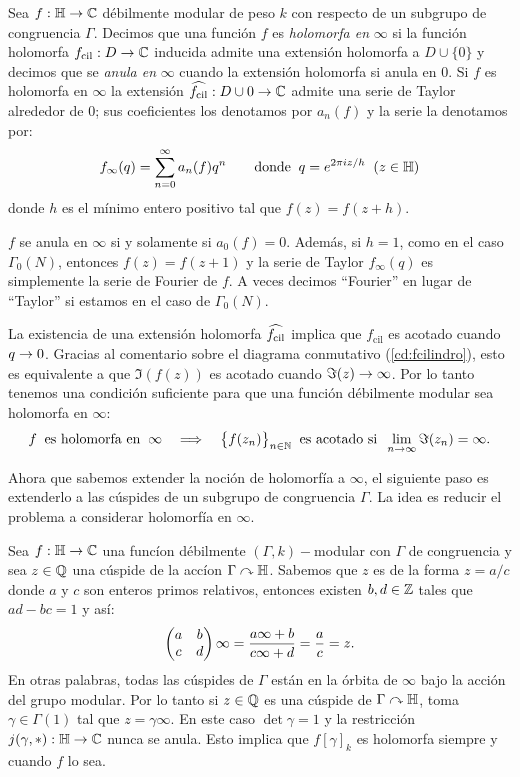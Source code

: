\begin{defin}
  Sea $f:\mathbb{H}\rightarrow\mathbb{C}$ d\'ebilmente modular de peso $k$ con respecto de un subgrupo de congruencia
  $\Gamma$. Decimos que una funci\'on $f$ es \emph{holomorfa en} $\infty$ si la funci\'on holomorfa
  $f_{\mathrm{cil}}:D\rightarrow\mathbb{C}$ inducida admite una extensi\'on holomorfa a $D\cup\{0\}$ y decimos que
  se \emph{anula en} $\infty$ cuando la extensi\'on holomorfa si anula en 0. Si $f$ es holomorfa en
  $\infty$ la extensi\'on $\what{f_{\mathrm{cil}}}:D\cup{0}\ra\CC$ admite una serie de Taylor
  alrededor de $0$; sus coeficientes los denotamos por $a_n(f)$ y la serie la denotamos por:
  \[
    f_{\infty}(q)=\sum_{n=0}^{\infty}a_n(f)q^n\qquad\text{donde}\;\; q=e^{2\pi i z/h}\;\;(z\in\mathbb{H})
  \]
  donde $h$ es el m\'inimo entero positivo tal que $f(z)=f(z+h)$.
\end{defin}

\begin{notas}
  $f$ se anula en $\infty$ si y solamente si $a_0(f)=0$. Adem\'as, si $h=1$, como en el caso
  $\Gamma_0(N)$, entonces $f(z)=f(z+1)$ y la serie de Taylor $f_{\infty}(q)$ es simplemente la
  serie de Fourier de $f$. A veces decimos ``Fourier'' en lugar de ``Taylor'' si estamos en el
  caso de $\Gamma_0(N)$.
\end{notas}

La existencia de una extensi\'on holomorfa $\what{f_{\mathrm{cil}}}$ implica que $f_{\mathrm{cil}}$
es acotado cuando $q\rightarrow0$. Gracias al comentario sobre el diagrama conmutativo (\ref{cd:fcilindro}),
esto es equivalente a que $\Im(f(z))$ es acotado cuando $\Im(z)\rightarrow\infty$. Por lo tanto tenemos una
condici\'on suficiente para que una funci\'on d\'ebilmente modular sea holomorfa en $\infty$:
\[
  f\;\;\text{es holomorfa en}\;\;\infty\quad\Longrightarrow\quad
  \big\{f(z_n)\big\}_{n\in\mathbb{N}}\;\;\text{es acotado si}\;\;\lim_{n\rightarrow\infty}\Im(z_n)=\infty.
\]

Ahora que sabemos extender la noci\'on de holomorf\'ia a $\infty$, el siguiente paso es extenderlo
a las c\'uspides de un subgrupo de congruencia $\Gamma$. La idea es reducir el problema a considerar
holomorf\'ia en $\infty$.

Sea $f:\mathbb{H}\rightarrow\mathbb{C}$ una func\'ion d\'ebilmente $(\Gamma,k)-$modular con $\Gamma$ de congruencia
y sea $z\in\mathbb{Q}$ una c\'uspide de la acc\'ion $\Gamma\curvearrowright\mathbb{H}$. Sabemos que $z$ es de la forma
$z=a/c$ donde $a$ y $c$ son enteros primos relativos, entonces existen $b,d\in\mathbb{Z}$ tales que
$ad-bc=1$ y as\'i:
\[
  \begin{pmatrix}a & b\\ c & d\end{pmatrix}\infty=\frac{a\infty+b}{c\infty+d}=\frac{a}{c}=z.
\]
En otras palabras, todas las c\'uspides de $\Gamma$ est\'an en la \'orbita
de $\infty$ bajo la acci\'on del grupo modular. Por lo tanto si $z\in\mathbb{Q}$ es una c\'uspide de
$\Gamma\curvearrowright\mathbb{H}$, toma $\gamma\in\Gamma(1)$ tal que $z=\gamma\infty$. En este caso $\det\gamma=1$
y la restricci\'on $j(\gamma,*):\mathbb{H}\rightarrow\mathbb{C}$ nunca se anula. Esto implica que $f[\gamma]_k$ es
holomorfa siempre y cuando $f$ lo sea.

